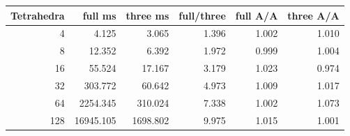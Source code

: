 \begin{center}\small
\begin{tabular}{@{}rrrrrr@{}}
\toprule
Tetrahedra & full ms & three ms & full/three & full A/A & three A/A \\
\midrule
4 & 4.125 & 3.065 & 1.396 & 1.002 & 1.010 \\
8 & 12.352 & 6.392 & 1.972 & 0.999 & 1.004 \\
16 & 55.524 & 17.167 & 3.179 & 1.023 & 0.974 \\
32 & 303.772 & 60.642 & 4.973 & 1.009 & 1.017 \\
64 & 2254.345 & 310.024 & 7.338 & 1.002 & 1.073 \\
128 & 16945.105 & 1698.802 & 9.975 & 1.015 & 1.001 \\
\bottomrule
\end{tabular}
\end{center}
